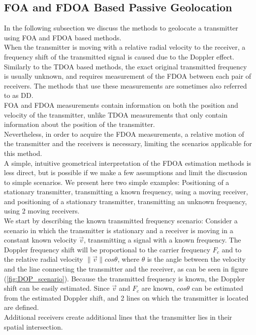 \subsection{FOA and FDOA Based Passive Geolocation}
In the following subsection we discuss the methods to geolocate a transmitter using FOA and FDOA based methods.\\

When the transmitter is moving with a relative radial velocity to the receiver, a frequency shift of the transmitted signal is caused due to the Doppler effect.\\
Similarly to the TDOA based methods, the exact original transmitted frequency is usually unknown, and requires measurement of the FDOA between each pair of receivers.
The methods that use these measurements are sometimes also referred to as DD.\\

FOA and FDOA measurements contain information on both the position and velocity of the transmitter, unlike TDOA measurements that only contain information about the position of the transmitter. \\
Nevertheless, in order to acquire the FDOA measurements, a relative motion of the transmitter and the receivers is necessary, limiting the scenarios applicable for this method.\\

A simple, intuitive geometrical interpretation of the FDOA estimation methods is less direct, but is possible if we make a few assumptions and limit the discussion to simple scenarios. We present here two simple examples: Positioning of a stationary transmitter, transmitting a known frequency, using a moving receiver, and positioning of a stationary transmitter, transmitting an unknown frequency, using 2 moving receivers.\\

We start by describing the known transmitted frequency scenario: Consider a scenario in which the transmitter is stationary and a receiver is moving in a constant known velocity $\vec{v}$, transmitting a signal with a known frequency. The Doppler frequency shift will be proportional to the carrier frequency $F_c$ and to the relative radial velocity $\|\vec{v}\|cos\theta$, where $\theta$ is the angle between the velocity and the line connecting the transmitter and the receiver, as can be seen in figure (\ref{fig:DOP_scenario}). Because the transmitted frequency is known, the Doppler shift can be easily estimated. Since $\vec{v}$ and $F_c$ are known, $cos\theta$ can be estimated from the estimated Doppler shift, and 2 lines on which the transmitter is located are defined.\\
Additional receivers create additional lines that the transmitter lies in their spatial intersection.\\

